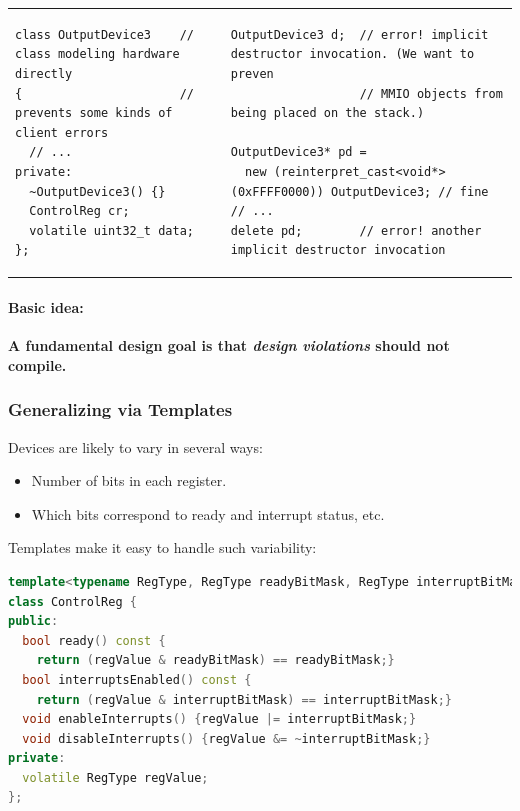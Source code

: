 \begin{tabular}{p{9.2cm}p{9.2cm}}
\begin{lstlisting}
class OutputDevice3    // class modeling hardware directly
{                      // prevents some kinds of client errors
  // ...
private:
  ~OutputDevice3() {}
  ControlReg cr;
  volatile uint32_t data;
};
\end{lstlisting}
&
\begin{lstlisting}
OutputDevice3 d;  // error! implicit destructor invocation. (We want to preven
                  // MMIO objects from being placed on the stack.)

OutputDevice3* pd =
  new (reinterpret_cast<void*>(0xFFFF0000)) OutputDevice3; // fine
// ...
delete pd;        // error! another implicit destructor invocation
\end{lstlisting}
\end{tabular}

\paragraph{Basic idea:}
\textbf{A fundamental design goal is that \textit{design violations} should not compile.}

\subsubsection{Generalizing via Templates}
Devices are likely to vary in several ways:
\begin{itemize}
  \item Number of bits in each register.
  \item Which bits correspond to ready and interrupt status, etc.
\end{itemize}
Templates make it easy to handle such variability:
\begin{lstlisting}[language=C++]
template<typename RegType, RegType readyBitMask, RegType interruptBitMask>
class ControlReg {
public:
  bool ready() const {
    return (regValue & readyBitMask) == readyBitMask;}
  bool interruptsEnabled() const {
    return (regValue & interruptBitMask) == interruptBitMask;}
  void enableInterrupts() {regValue |= interruptBitMask;}
  void disableInterrupts() {regValue &= ~interruptBitMask;}
private:
  volatile RegType regValue;
};
\end{lstlisting}

